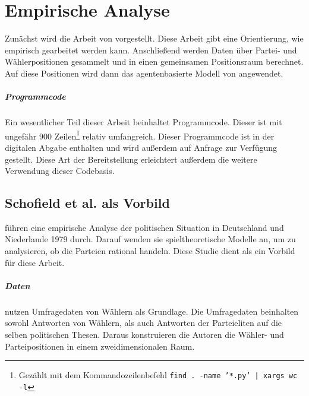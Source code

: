 
\chapter{Empirische Analyse}\label{Kap-Empirische-Analyse}

Zunächst wird die Arbeit von \citet{schofield1998germany} vorgestellt.
Diese Arbeit gibt eine Orientierung, wie empirisch gearbeitet werden kann.
Anschließend werden Daten über Partei- und Wählerpositionen gesammelt und in einen gemeinsamen Positionsraum berechnet. Auf diese Positionen wird dann das agentenbasierte Modell von \citet{laver2005policy} angewendet.

\paragraph{Programmcode}
Ein wesentlicher Teil dieser Arbeit beinhaltet Programmcode. Dieser ist mit ungefähr 900 Zeilen\footnote{Gezählt mit dem Kommandozeilenbefehl \texttt{find . -name '*.py' | xargs wc -l}} relativ umfangreich.
Dieser Programmcode ist in der digitalen Abgabe enthalten und wird außerdem auf Anfrage zur Verfügung gestellt.
Diese Art der Bereitstellung erleichtert außerdem die weitere Verwendung dieser Codebasis.

\section{Schofield et al. als Vorbild}

\citet{schofield1998germany} führen eine empirische Analyse der politischen Situation in Deutschland und Niederlande 1979 durch. Darauf wenden sie spieltheoretische Modelle an, um zu analysieren, ob die Parteien rational handeln. Diese Studie dient als ein Vorbild für diese Arbeit.

\paragraph{Daten}
\citet{schofield1998germany} nutzen Umfragedaten von Wählern als Grundlage. Die Umfragedaten beinhalten sowohl Antworten von Wählern, als auch Antworten der Parteieliten auf die selben politischen Thesen. Daraus konstruieren die Autoren die Wähler- und Parteipositionen in einem zweidimensionalen Raum.
\citep[S.\,268-269]{schofield1998germany}

